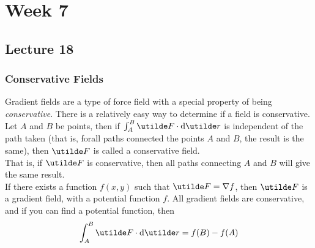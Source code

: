 \documentclass{report}
\begin{document}

\chapter{Week 7}
\section{Lecture 18}
\subsection*{Conservative Fields}
Gradient fields are a type of force field with a special property of being \textit{conservative}. There is a relatively easy way to determine if a field is conservative. \\

Let $A$ and $B$ be points, then if $\int_A^B \ut{F}\cd\d\ut{r}$ is independent of the path taken (that is, forall paths connected the points $A$ and $B$, the result is the same), then $\ut{F}$ is called a conservative field. \\

That is, if $\ut{F}$ is conservative, then all paths connecting $A$ and $B$ will give the same result. \\

If there exists a function $f(x,y)$ such that $\ut{F} = \grad f$, then $\ut{F}$ is a gradient field, with a potential function $f$. All gradient fields are conservative, and if you can find a potential function, then
$$
	\int_A^B \ut{F}\cd\d\ut{r} = f(B) - f(A)
$$
\end{document}
